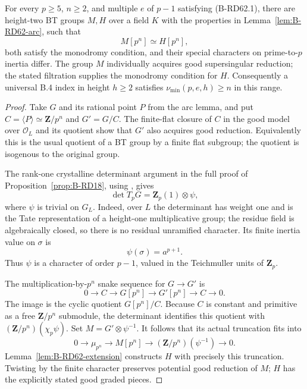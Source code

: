 \begin{theorem}
\label{thm:B-RD62}
For every $p\ge5$, $n\ge2$, and multiple $e$ of $p-1$ satisfying
(B-RD62.1), there are height-two BT groups $M,H$ over a field $K$
with the properties in Lemma~\ref{lem:B-RD62-arc}, such that
\[
                            M[p^n]\simeq H[p^n],        \tag{B-RD62.12}
\]
both satisfy the monodromy condition, and their special characters
on prime-to-$p$ inertia differ.  The group $M$ individually acquires
good supersingular reduction; the stated filtration supplies the
monodromy condition for $H$.
Consequently a universal B.4 index in height $h\ge2$ satisfies
$\nu_{\min}(p,e,h)\ge n$ in this range.
\end{theorem}
\begin{proof}
Take $G$ and its rational point $P$ from the arc lemma, and put
$C=\langle P\rangle\simeq\mathbf Z/p^n$ and $G'=G/C$.
The finite-flat closure of $C$ in the good model over $\mathcal O_L$
and its quotient show that $G'$ also acquires good reduction.
Equivalently this is the usual quotient of a BT group by a finite
flat subgroup; the quotient is isogenous to the original group.

The rank-one crystalline determinant argument in the full proof of
Proposition~\ref{prop:B-RD18}, using
\cite[Corollary~2.2.6]{Kisin2006Crystalline}, gives
\[
                      \det T_pG=\mathbf Z_p(1)\otimes\psi,
\]
where $\psi$ is trivial on $G_L$.  Indeed, over $L$ the determinant
has weight one and is the Tate representation of a height-one
multiplicative group; the residue field is algebraically closed,
so there is no residual unramified character.  Its finite inertia
value on $\sigma$ is
\[
                         \psi(\sigma)=a^{p+1}.
                                                        \tag{B-RD62.13}
\]
Thus $\psi$ is a character of order $p-1$, valued in the Teichmuller
units of $\mathbf Z_p$.

The multiplication-by-$p^n$ snake sequence for $G\to G'$ is
\[
 0\longrightarrow C\longrightarrow G[p^n]
  \longrightarrow G'[p^n]\longrightarrow C\longrightarrow0.
\]
The image is the cyclic quotient $G[p^n]/C$.  Because $C$ is
constant and primitive as a free $\mathbf Z/p^n$ submodule, the
determinant identifies this quotient with
$(\mathbf Z/p^n)(\chi_p\psi)$.  Set $M=G'\otimes\psi^{-1}$.
It follows that its actual truncation fits into
\[
 0\longrightarrow\mu_{p^n}\longrightarrow M[p^n]
       \longrightarrow(\mathbf Z/p^n)(\psi^{-1})
       \longrightarrow0.
\]
Lemma~\ref{lem:B-RD62-extension} constructs $H$ with precisely this
truncation.  Twisting by the finite character preserves potential
good reduction of $M$; $H$ has the explicitly stated good graded
pieces.


\end{proof}

